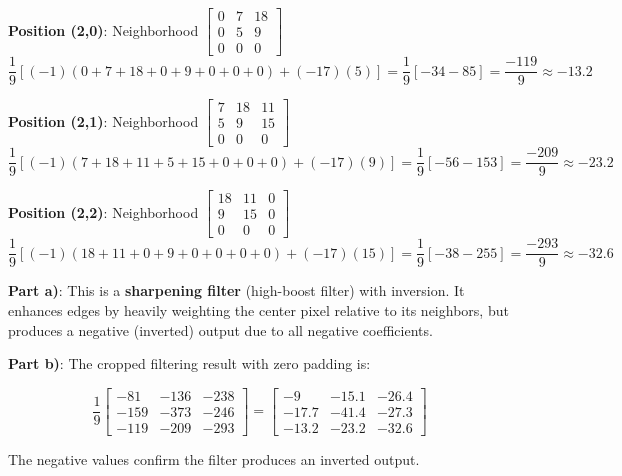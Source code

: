 \documentclass[12pt]{article}
\begin{document}
\begin{stepbox}

\textbf{Position (2,0)}: Neighborhood $\begin{bmatrix} 0 & 7 & 18 \\ 0 & 5 & 9 \\ 0 & 0 & 0 \end{bmatrix}$
\[
\frac{1}{9}[(-1)(0+7+18+0+9+0+0+0) + (-17)(5)] = \frac{1}{9}[-34-85] = \frac{-119}{9} \approx -13.2
\]

\textbf{Position (2,1)}: Neighborhood $\begin{bmatrix} 7 & 18 & 11 \\ 5 & 9 & 15 \\ 0 & 0 & 0 \end{bmatrix}$
\[
\frac{1}{9}[(-1)(7+18+11+5+15+0+0+0) + (-17)(9)] = \frac{1}{9}[-56-153] = \frac{-209}{9} \approx -23.2
\]

\textbf{Position (2,2)}: Neighborhood $\begin{bmatrix} 18 & 11 & 0 \\ 9 & 15 & 0 \\ 0 & 0 & 0 \end{bmatrix}$
\[
\frac{1}{9}[(-1)(18+11+0+9+0+0+0+0) + (-17)(15)] = \frac{1}{9}[-38-255] = \frac{-293}{9} \approx -32.6
\]

\end{stepbox}

\begin{resultsbox}

\textbf{Part a)}: This is a \textbf{sharpening filter} (high-boost filter) with inversion. It enhances edges by heavily weighting the center pixel relative to its neighbors, but produces a negative (inverted) output due to all negative coefficients.

\vspace{0.3cm}

\textbf{Part b)}: The cropped filtering result with zero padding is:

\[
\boxed{\frac{1}{9}\begin{bmatrix} -81 & -136 & -238 \\ -159 & -373 & -246 \\ -119 & -209 & -293 \end{bmatrix}
= \begin{bmatrix} -9 & -15.1 & -26.4 \\ -17.7 & -41.4 & -27.3 \\ -13.2 & -23.2 & -32.6 \end{bmatrix}}
\]

The negative values confirm the filter produces an inverted output.

\end{resultsbox}
\end{document}
